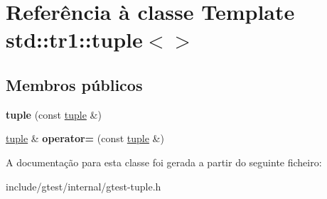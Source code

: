\hypertarget{classstd_1_1tr1_1_1tuple_3_4}{\section{Referência à classe Template std\-:\-:tr1\-:\-:tuple$<$$>$}
\label{classstd_1_1tr1_1_1tuple_3_4}
}
\subsection*{Membros públicos}
\begin{DoxyCompactItemize}
\item 
\hypertarget{classstd_1_1tr1_1_1tuple_3_4_aa857599acb126134e29dc5e53fd9d1a7}{{\bfseries tuple} (const \hyperlink{classstd_1_1tr1_1_1tuple}{tuple} \&)}\label{classstd_1_1tr1_1_1tuple_3_4_aa857599acb126134e29dc5e53fd9d1a7}

\item 
\hypertarget{classstd_1_1tr1_1_1tuple_3_4_a93ddab6f662662fc49635608619150c8}{\hyperlink{classstd_1_1tr1_1_1tuple}{tuple} \& {\bfseries operator=} (const \hyperlink{classstd_1_1tr1_1_1tuple}{tuple} \&)}\label{classstd_1_1tr1_1_1tuple_3_4_a93ddab6f662662fc49635608619150c8}

\end{DoxyCompactItemize}


A documentação para esta classe foi gerada a partir do seguinte ficheiro\-:\begin{DoxyCompactItemize}
\item 
include/gtest/internal/gtest-\/tuple.\-h\end{DoxyCompactItemize}
